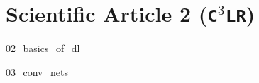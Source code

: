 \documentclass[whitelogo]{TUD-report2020}
\newcommand{\ccclr}{\texttt{C$^3$LR}}
\begin{document}
\chapter{Scientific Article 2 (\ccclr)}\label{chap:c3lr-art}


% 

% 
{02_basics_of_dl}

{03_conv_nets}















\appendix

%

\printbibliography
\end{document}
